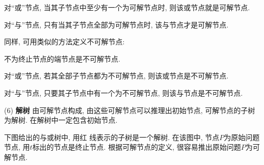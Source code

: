  对“或”节点, 当其子节点中至少有一个为可解节点时, 则该或节点就是可解节点.

 对“与”节点, 只有当其子节点全部为可解节点时, 该与节点才是可解节点.

同样, 可用类似的方法定义不可解节点:

 不为终止节点的端节点是不可解节点.

 对“或”节点, 若其全部子节点都为不可解节点, 则该或节点是不可解节点.

 对“与”节点, 只要其子节点中有一个为不可解节点, 则该与节点是不可解节点.

(6) \textbf{解树} 由可解节点构成, 由这些可解节点可以推理出初始节点, 可解节点的子树为解树. 在解树中一定包含初始节点.
\begin{example}
  下图给出的与或树中, 用红 线表示的子树是一个解树. 在该图中, 节点$P$为原始问题节点, 用$t$标出的节点是终止节点. 根据可解节点的定义, 很容易推出原始问题$P$为可解节点.
\end{example}

